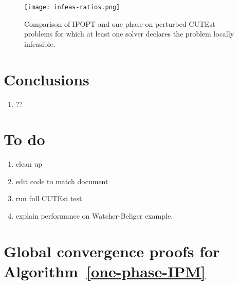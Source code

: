 \documentclass{article}
\begin{document}
\begin{figure}[H]
\texttt{[image: infeas-ratios.png]}
\caption{Comparison of IPOPT and one phase on perturbed CUTEst problems for which at least one solver declares the problem locally infeasible.}\label{fig:comparison-IPOPT-on-perturbed-CUTEst}
\end{figure}

%
%
%
%


\section{Conclusions}
\begin{enumerate}
\item ??
\end{enumerate}


\section{To do}

\begin{enumerate}
\item clean up 
\item edit code to match document
\item run full CUTEst test
\item explain performance on Watcher-Beliger example.
\end{enumerate}





\appendix

\section{Global convergence proofs for Algorithm~\ref{one-phase-IPM}}\label{app:global-conv}
\end{document}
